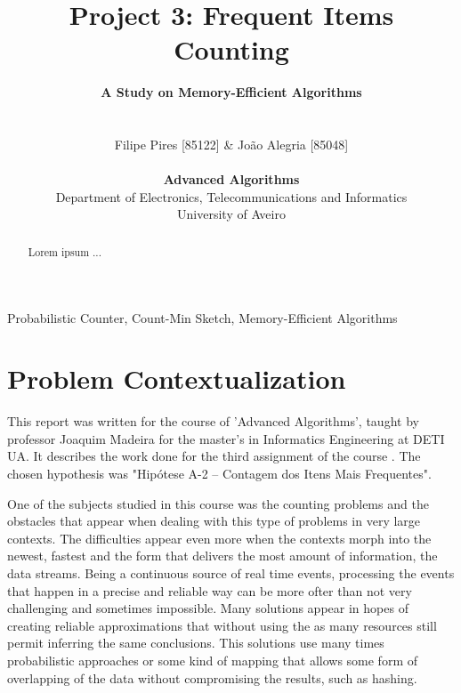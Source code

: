 \documentclass[shortpaper]{revdetua}
\begin{document}
 

\title{
    \LARGE{{\bf Project 3: Frequent Items Counting \/}}
    \vspace{-20pt}
}

\author{
    \Large{{\bf A Study on Memory-Efficient Algorithms\/}}\\\\\\
    Filipe Pires [85122] \& João Alegria [85048]\\
    \\
    {\bf Advanced Algorithms\/}\\
    \normalsize{Department of Electronics, Telecommunications and Informatics}\\
    \normalsize{University of Aveiro}\\
} 

\maketitle


\begin{abstract}
    Lorem ipsum ...
\end{abstract}

\begin{keywords}
    Probabilistic Counter, Count-Min Sketch, Memory-Efficient Algorithms
\end{keywords}


\section{Problem Contextualization}\label{problem}

This report was written for the course of 'Advanced Algorithms', taught by 
professor Joaquim Madeira for the master's in Informatics Engineering at DETI UA.
It describes the work done for the third assignment of the course \cite{trab3}.
The chosen hypothesis was "Hipótese A-2 – Contagem dos Itens Mais Frequentes".

One of the subjects studied in this course was the counting problems and the obstacles that appear when dealing with this type of problems in very large contexts. The difficulties appear even more when the contexts morph into the newest, fastest and the form that delivers the most amount of information, the data streams. Being a continuous source of real time events, processing the events that happen in a precise and reliable way can be more ofter than not very challenging and sometimes impossible. Many solutions appear in hopes of creating reliable approximations that without using the as many resources still permit inferring the same conclusions. This solutions use many times probabilistic approaches or some kind of mapping that allows some form of overlapping of the data without compromising the results, such as hashing. 
\end{document}

